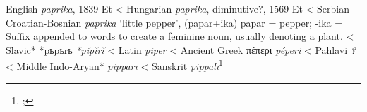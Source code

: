 \begin{etymology}\label{ety:paprika}
English \textit{paprika}, 1839 Et
< Hungarian \textit{paprika}, diminutive?, 1569 Et
< Serbian-Croatian-Bosnian \textit{paprika} `little pepper', (papar+ika) papar = pepper; -ika = Suffix appended to words to create a feminine noun, usually denoting a plant.
< Slavic* {*pьpьrь} \textit{*pĭpĭrĭ }
< Latin \textit{piper}
< Ancient Greek {πέπερι} \textit{péperi}
< Pahlavi \textit{?}
< Middle Indo-Aryan* \textit{pipparī}
< Sanskrit \textit{pippalī}\footnote{; }
\end{etymology}
